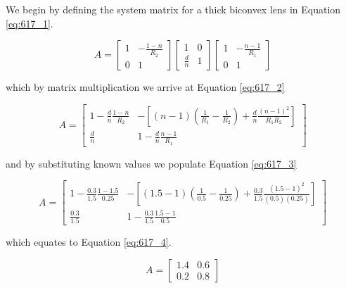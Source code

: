 \documentclass[main.tex]{subfiles}
\begin{document}
We begin by defining the system matrix for a thick biconvex lens in Equation \ref{eq:617_1}.

\begin{equation}\label{eq:617_1}
A =
\begin{bmatrix}
    1   &   -\frac{1-n}{R_2} \\
    0   &   1
\end{bmatrix}
\begin{bmatrix}
    1   &   0 \\
    \frac{d}{n}   &   1
\end{bmatrix}
\begin{bmatrix}
    1   &   -\frac{n-1}{R_1} \\
    0   &   1
\end{bmatrix}
\end{equation}


which by matrix multiplication we arrive at Equation \ref{eq:617_2}

\begin{equation}\label{eq:617_2}
A=
\begin{bmatrix}
    1  - \frac{d}{n}\frac{1-n}{R_2}   &  -\left[ (n-1) \left(\frac{1}{R_1}-\frac{1}{R_2}\right)  + \frac{d}{n}\frac{(n-1)^2}{R_1 R_2} \right]\\
    \frac{d}{n}                       &   1  - \frac{d}{n}\frac{n-1}{R_1}
\end{bmatrix}
\end{equation}

and by substituting known values we populate Equation \ref{eq:617_3}

\begin{equation}\label{eq:617_3}
A=
\begin{bmatrix}
    1  - \frac{0.3}{1.5}\frac{1-1.5}{0.25} &  -\left[ (1.5-1) \left(\frac{1}{0.5}-\frac{1}{0.25}\right)  + \frac{0.3}{1.5}\frac{(1.5-1)^2}{(0.5)(0.25)} \right]\\
    \frac{0.3}{1.5}                       &   1  - \frac{0.3}{1.5}\frac{1.5-1}{0.5}
\end{bmatrix}
\end{equation}

which equates to Equation \ref{eq:617_4}.

\begin{equation}\label{eq:617_4}
A=
\begin{bmatrix}
    1.4 &  0.6\\
    0.2 &   0.8
\end{bmatrix}
\end{equation}
\end{document}
